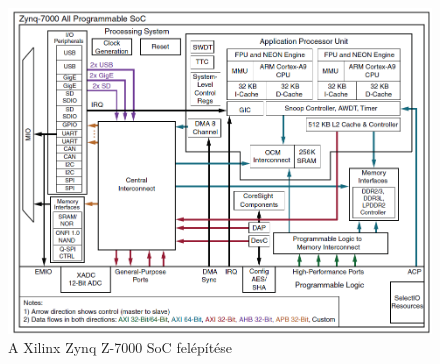 \begin{figure}[!ht]
	\centering
	\includegraphics[width = \textwidth]{figures/socfelepites.png}
	\caption{A Xilinx Zynq Z-7000 SoC felépítése\cite{ZynqSOC}} 
	\label{fig:z7000}
\end{figure}